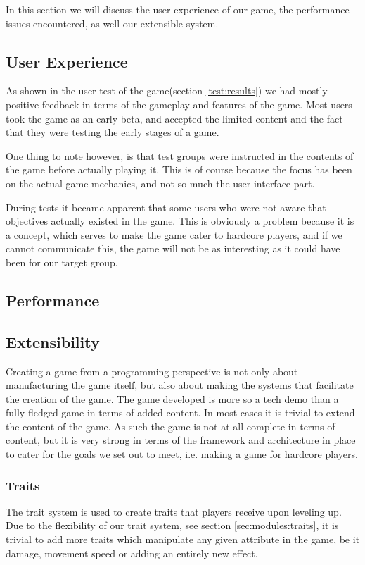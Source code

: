 In this section we will discuss the user experience of our game, the performance issues encountered, as well our extensible system.

\subsection{User Experience}
As shown in the user test of the game(section \ref{test:results}) we had mostly positive feedback in terms of the gameplay and features of the game.
Most users took the game as an early beta, and accepted the limited content and the fact that they were testing the early stages of a game.

One thing to note however, is that test groups were instructed in the contents of the game before actually playing it.
This is of course because the focus has been on the actual game mechanics, and not so much the user interface part.

During tests it became apparent that some users who were not aware that objectives actually existed in the game.
This is obviously a problem because it is a concept, which serves to make the game cater to hardcore players, and if we cannot communicate this, the game will not be as interesting as it could have been for our target group.

\subsection{Performance}

\subsection{Extensibility}
Creating a game from a programming perspective is not only about manufacturing the game itself, but also about making the systems that facilitate the creation of the game.
The game developed is more so a tech demo than a fully fledged game in terms of added content.
In most cases it is trivial to extend the content of the game. 
As such the game is not at all complete in terms of content, but it is very strong in terms of the framework and architecture in place to cater for the goals we set out to meet, i.e. making a game for hardcore players.

\subsubsection{Traits}\label{dicsussion:traits}
The trait system is used to create traits that players receive upon leveling up.
Due to the flexibility of our trait system, see section \ref{sec:modules:traits}, it is trivial to add more traits which manipulate any given attribute in the game, be it damage, movement speed or adding an entirely new effect. 

